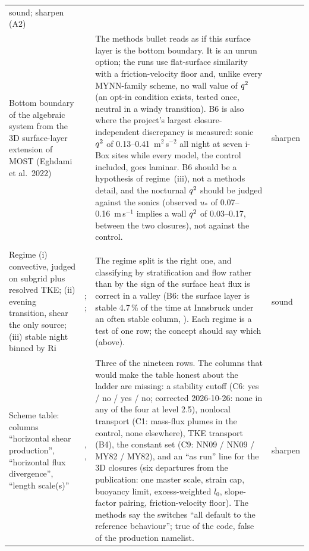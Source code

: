 \begin{center}
\begin{xltabular}{\linewidth}{@{}>{\raggedright\arraybackslash}p{3.3cm}
  >{\raggedright\arraybackslash}p{1.4cm}
  >{\raggedright\arraybackslash}X
  >{\raggedright\arraybackslash}p{1.6cm}@{}}
sound; sharpen (A2) \\
\addlinespace[3pt]
Bottom boundary of the algebraic system from the 3D surface-layer extension of MOST (Eghdami et al.\ 2022) &
 &
The methods bullet reads as if this surface layer is the bottom boundary. It is an unrun option; the runs use flat-surface similarity with a friction-velocity floor and, unlike every MYNN-family scheme, no wall value of $q^{2}$ (an opt-in condition exists, tested once, neutral in a windy transition). B6 is also where the project's largest closure-independent discrepancy is measured: sonic $q^{2}$ of 0.13--0.41~m$^2$\,s$^{-2}$ all night at seven i-Box sites while every model, the control included, goes laminar. B6 should be a hypothesis of regime~(iii), not a methods detail, and the nocturnal $q^{2}$ should be judged against the sonics (observed $u_*$ of 0.07--0.16~m\,s$^{-1}$ implies a wall $q^{2}$ of 0.03--0.17, between the two closures), not against the control. &
sharpen \\
\addlinespace[4pt]
 \\
\addlinespace[2pt]
Regime (i) convective, judged on subgrid plus resolved TKE; (ii) evening transition, shear the only source; (iii) stable night binned by $\mathrm{Ri}$ &
; ;  &
The regime split is the right one, and classifying by stratification and flow rather than by the sign of the surface heat flux is correct in a valley (B6: the surface layer is stable 4.7\,\% of the time at Innsbruck under an often stable column, \citeauthor{ward2022}). Each regime is a test of one row; the concept should say which (above). &
sound \\
\addlinespace[3pt]
Scheme table: columns ``horizontal shear production'', ``horizontal flux divergence'', ``length scale(s)'' &
, ,  &
Three of the nineteen rows. The columns that would make the table honest about the ladder are missing: a stability cutoff (C6: yes / no / yes / no; corrected 2026-10-26: none in any of the four at level 2.5), nonlocal transport (C1: mass-flux plumes in the control, none elsewhere), TKE transport (B4), the constant set (C9: NN09 / NN09 / MY82 / MY82), and an ``as run'' line for the 3D closures (six departures from the publication: one master scale, strain cap, buoyancy limit, excess-weighted $l_0$, slope-factor pairing, friction-velocity floor). The methods say the switches ``all default to the reference behaviour''; true of the code, false of the production namelist. &
sharpen \\

\end{xltabular}
\end{center}
